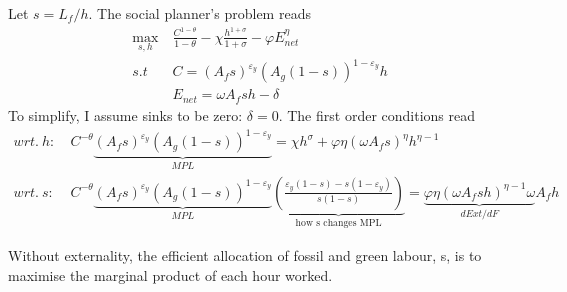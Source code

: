 Let $s=L_f/h$. The social planner's problem reads
\begin{align}
\underset{s, h}{\max}\ & \frac{C^{1-\theta}}{1-\theta}-\chi \frac{h^{1+\sigma}}{1+\sigma}-\varphi E_{net}^{\eta}\\
s.t\ \ & C=\left(A_fs\right)^{\varepsilon_y}\left(A_g(1-s)\right)^{1-\varepsilon_y}h\\
& E_{net}=\omega A_fsh-\delta
\end{align}
To simplify, I assume sinks to be zero: $\delta=0$.
The first order conditions read
\begin{align}
wrt.\ h:\ & C^{-\theta}\underbrace{(A_fs)^{\varepsilon_y}(A_g(1-s))^{1-\varepsilon_y}}_{MPL}=\chi h^\sigma+\varphi \eta (\omega A_f s)^\eta h^{\eta-1}\\
wrt.\ s:\ & C^{-\theta}\underbrace{(A_fs)^{\varepsilon_y}(A_g(1-s))^{1-\varepsilon_y}}_{MPL}\underbrace{\left(\frac{\varepsilon_y(1-s)-s(1-\varepsilon_y)}{s(1-s)}\right)}_{\text{how s changes MPL}}=\underbrace{\varphi \eta (\omega A_f s h)^{\eta-1}\omega }_{dExt/dF} A_f h
\end{align}

Without externality, the efficient allocation of fossil and green labour, s, is to maximise the marginal product of each hour worked.